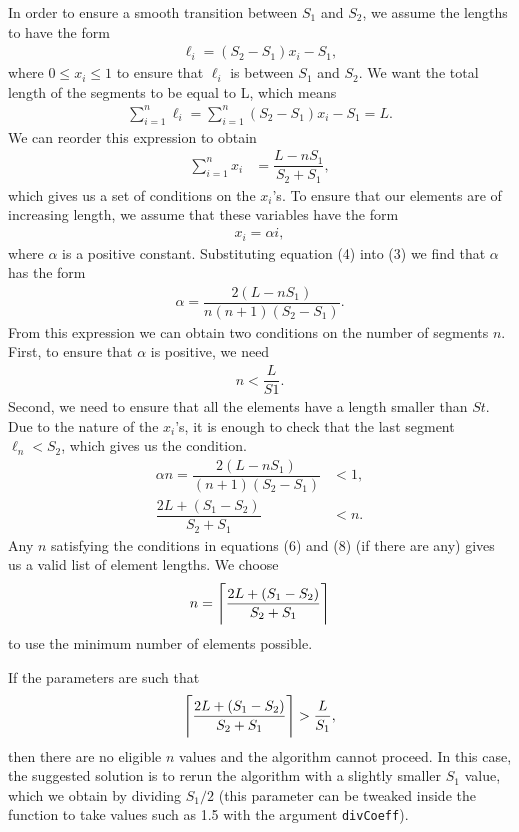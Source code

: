\documentclass[12pt]{article}
\newcommand{\So}{S_1}
\newcommand{\St}{S_2}
\DeclarePairedDelimiter{\ceil}{\lceil}{\rceil}
\begin{document}
In order to ensure a smooth transition between $\So$ and $\St$, we assume the lengths to have the form 
\begin{align}
    \ell_i = (\St - \So) x_i - \So,
\end{align} 
where $0 \leq x_i \leq 1$ to ensure that $\ell_i$ is between $\So$ and $\St$. 
We want the total length of the segments to be equal to L, which means 
\begin{align}
    \sum_{i=1}^{n} \ell_i = \sum_{i=1}^{n} (\St - \So) x_i - \So = L.
\end{align}
We can reorder this expression to obtain
\begin{align}    
    \sum_{i=1}^{n} x_i &= \dfrac{L - n \So}{\St + \So},
\end{align} 
which gives us a set of conditions on the $x_i$'s. 
To ensure that our elements are of increasing length, we assume that these variables have the form
\begin{align}
    x_i = \alpha i,
\end{align}
where $\alpha$ is a positive constant. Substituting equation (4) into (3) we find that $\alpha$ has the form 
\begin{align}
    \alpha = \dfrac{2 (L - n \So)}{n (n+1) (\St - \So)}.
\end{align}
From this expression we can obtain two conditions on the number of segments $n$. First, to ensure that $\alpha$ is positive, we need 
\begin{align}
    n < \dfrac{L}{S1}.
\end{align}
Second, we need to ensure that all the elements have a length smaller than $St$. Due to the nature of the $x_i$'s, it is enough to check that the last segment $\ell_n < \St$, which gives us the condition. 
\begin{align}
    \alpha n = \dfrac{2 (L - n \So)}{(n+1) (\St - \So)} &< 1,  \\
    \dfrac{2L + (\So - \St)}{\St + \So} &< n. 
\end{align} 
Any $n$ satisfying the conditions in equations (6) and (8) (if there are any) gives us a valid list of element lengths. We choose 
\begin{align}
    n = \ceil[\Bigg]{\dfrac{2L + (\So - \St)}{\St + \So}}
\end{align}
to use the minimum number of elements possible. 

If the parameters are such that 
\begin{align}
    \ceil[\Bigg]{\dfrac{2L + (\So - \St)}{\St + \So}} > \dfrac{L}{\So},
\end{align}
then there are no eligible $n$ values and the algorithm cannot proceed. In this case, the suggested solution is to rerun the algorithm with a slightly smaller $\So$ value, which we obtain by dividing $\So / 2$ (this parameter can be tweaked inside the function to take values such as 1.5 with the argument \verb|divCoeff|). 
\end{document}
